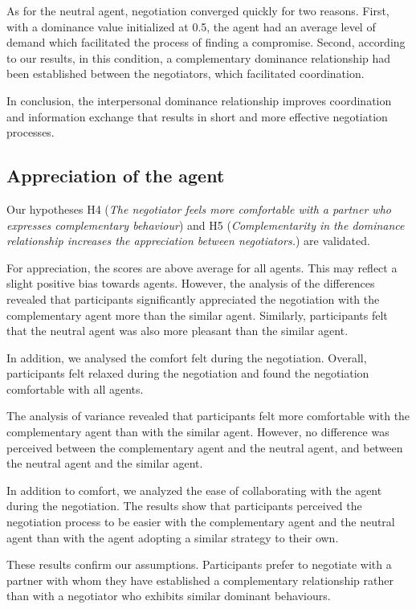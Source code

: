 \documentclass[10pt, a4paper, twocolumn]{article} %
\begin{document}
As for the neutral agent, negotiation converged quickly for two reasons. First, with a dominance value initialized at 0.5, the agent had an average level of demand which facilitated the process of finding a compromise. 
Second, according to our results, in this condition, a complementary dominance relationship had been established between the negotiators, which facilitated coordination. 

In conclusion, the interpersonal dominance relationship improves coordination and information exchange that results in short and more effective negotiation processes.

\subsection{Appreciation of the agent}
Our hypotheses H4 (\textit{The negotiator feels more comfortable with a partner who expresses complementary behaviour}) and H5 (\textit{Complementarity in the dominance relationship increases the appreciation between negotiators.}) are validated. 

For appreciation, the scores are above average for all agents. This may reflect a slight positive bias towards agents. However, the analysis of the differences revealed that participants significantly appreciated the negotiation with the complementary agent more than the similar agent. Similarly, participants felt that the neutral agent was also more pleasant than the similar agent. 

In addition, we analysed the comfort felt during the negotiation. Overall, participants felt relaxed during the negotiation and found the negotiation comfortable with all agents.  

The analysis of variance revealed that participants felt more comfortable with the complementary agent than with the similar agent. However, no difference was perceived between the complementary agent and the neutral agent, and between the neutral agent and the similar agent.

In addition to comfort, we analyzed the ease of collaborating with the agent during the negotiation. The results show that participants perceived the negotiation process to be easier with the complementary agent and the neutral agent than with the agent adopting a similar strategy to their own. 

These results confirm our assumptions. Participants prefer to negotiate with a partner with whom they have established a complementary relationship rather than with a negotiator who exhibits similar dominant behaviours. 
\end{document}
